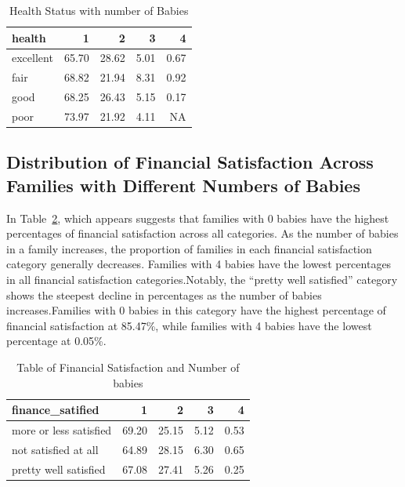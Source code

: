 \documentclass[
  letterpaper,
  DIV=11,
  numbers=noendperiod]{scrartcl}
\begin{document}
\hypertarget{tbl-heal}{}
\begin{table}
\caption{\label{tbl-heal}Health Status with number of Babies }\tabularnewline

\centering
\begin{tabular}{l|r|r|r|r}
\hline
health & 1 & 2 & 3 & 4\\
\hline
excellent & 65.70 & 28.62 & 5.01 & 0.67\\
\hline
fair & 68.82 & 21.94 & 8.31 & 0.92\\
\hline
good & 68.25 & 26.43 & 5.15 & 0.17\\
\hline
poor & 73.97 & 21.92 & 4.11 & NA\\
\hline
\end{tabular}
\end{table}

\hypertarget{distribution-of-financial-satisfaction-across-families-with-different-numbers-of-babies}{%
\subsection{Distribution of Financial Satisfaction Across Families with
Different Numbers of
Babies}\label{distribution-of-financial-satisfaction-across-families-with-different-numbers-of-babies}}

In Table~\ref{tbl-fin}, which appears suggests that families with 0
babies have the highest percentages of financial satisfaction across all
categories. As the number of babies in a family increases, the
proportion of families in each financial satisfaction category generally
decreases. Families with 4 babies have the lowest percentages in all
financial satisfaction categories.Notably, the ``pretty well satisfied''
category shows the steepest decline in percentages as the number of
babies increases.Families with 0 babies in this category have the
highest percentage of financial satisfaction at 85.47\%, while families
with 4 babies have the lowest percentage at 0.05\%.

\hypertarget{tbl-fin}{}
\begin{table}
\caption{\label{tbl-fin}Table of Financial Satisfaction and Number of babies }\tabularnewline

\centering
\begin{tabular}{l|r|r|r|r}
\hline
finance\_satified & 1 & 2 & 3 & 4\\
\hline
more or less satisfied & 69.20 & 25.15 & 5.12 & 0.53\\
\hline
not satisfied at all & 64.89 & 28.15 & 6.30 & 0.65\\
\hline
pretty well satisfied & 67.08 & 27.41 & 5.26 & 0.25\\
\hline
\end{tabular}
\end{table}
\end{document}
